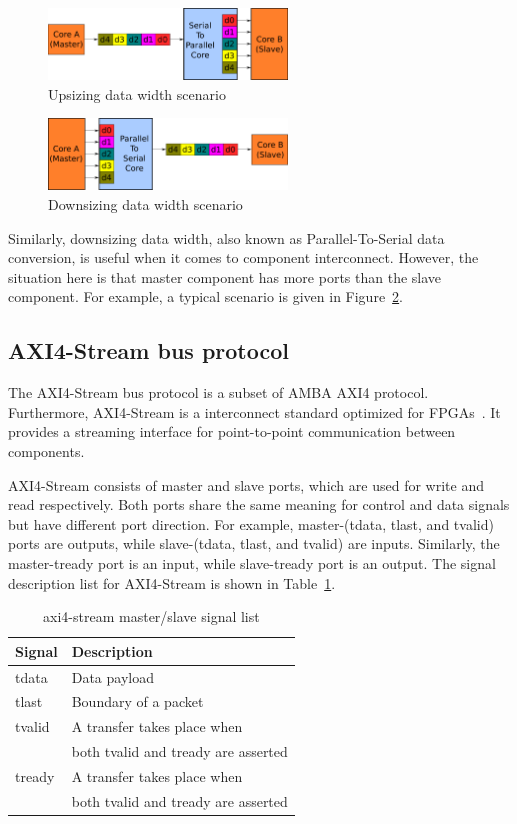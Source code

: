 \documentclass[10pt, conference, compsocconf]{IEEEtran}
\begin{document}
\begin{figure}[!t]
\centering
\includegraphics[width=2.5in]{images/s2p.png}
\caption{Upsizing data width scenario}
\label{s2p}
\end{figure}

\begin{figure}[!t]
\centering
\includegraphics[width=2.5in]{images/p2s.png}
\caption{Downsizing data width scenario}
\label{p2s}
\end{figure}


Similarly, downsizing data width, also known as Parallel-To-Serial data conversion, is useful when it comes to component interconnect. However, the situation here is that master component has more ports than the slave component. For example, a typical scenario is given in Figure~\ref{p2s}. 

\subsection{AXI4-Stream bus protocol}

The AXI4-Stream bus protocol is a subset of AMBA AXI4 protocol. Furthermore, AXI4-Stream is a interconnect standard optimized for FPGAs~\cite{100tips}. It provides a streaming interface for point-to-point communication between components. 

AXI4-Stream consists of master and slave ports, which are used for write and read respectively. Both ports share the same meaning for control and data signals but have different port direction. For example, master-(tdata, tlast, and tvalid) ports are outputs, while slave-(tdata, tlast, and tvalid) are inputs. Similarly, the master-tready port is an input, while slave-tready port is an output. The signal description list for AXI4-Stream is shown in Table~\ref{table:axi}. 

\begin{table}[!t]
	\caption{axi4-stream master/slave signal list}
    \label{table:axi}
    \centering    
    \begin{tabular}{ | l | l |}
    \hline
Signal & Description \\ \hline \hline
tdata & Data payload \\ \hline
tlast & Boundary of a packet \\  \hline
tvalid & A transfer takes place when \\ 
& both tvalid and tready are asserted \\ \hline
tready & A transfer takes place when \\ 
& both tvalid and tready are asserted \\ \hline
    \end{tabular}
\end{table}
\end{document}
